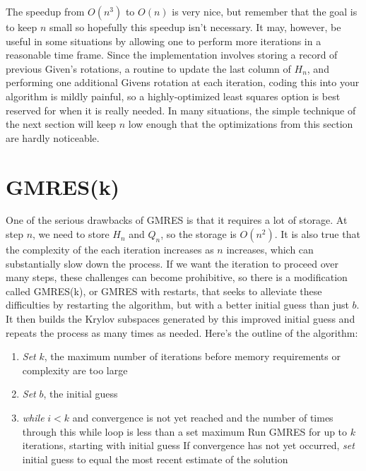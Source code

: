 The speedup from $O(n^3)$ to $O(n)$ is very nice, but remember that the goal is to keep $n$ small so hopefully this speedup isn't necessary.
It may, however, be useful in some situations by allowing one to perform more iterations in a reasonable time frame.
Since the implementation involves storing a record of previous Given's rotations, a routine to update the last column of $H_n$, and performing one additional Givens rotation at each iteration, coding this into your algorithm is mildly painful, so a highly-optimized least squares option is best reserved for when it is really needed.
In many situations, the simple technique of the next section will keep $n$ low enough that the optimizations from this section are hardly noticeable.
%

\section*{GMRES(k)}
One of the serious drawbacks of GMRES is that it requires a lot of storage.
At step $n$, we need to store $H_n$ and $Q_n$, so the storage is $O(n^2)$.
It is also true that the complexity of the each iteration increases as $n$ increases, which can substantially slow down the process.
If we want the iteration to proceed over many steps, these challenges can become prohibitive, so there is a modification called GMRES(k), or GMRES with restarts, that seeks to alleviate these difficulties by restarting the algorithm, but with a better initial guess than just $b$.
It then builds the Krylov subspaces generated by this improved initial guess and repeats the process as many times as needed.
Here's the outline of the algorithm:
\begin{enumerate}
\item \emph{Set} $k$, the maximum number of iterations before memory requirements or complexity are too large
\item \emph{Set} $b$, the initial guess
\item \emph{while} $i<k$ and convergence is not yet reached and the number of times through this while loop is less than a set maximum
\subitem Run GMRES for up to $k$ iterations, starting with initial guess
\subitem If convergence has not yet occurred, \emph{set} initial guess to equal the most recent estimate of the solution
\end{enumerate}

